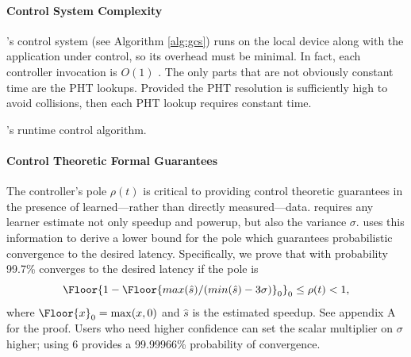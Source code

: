 \paragraph{Control System Complexity}
\SYSTEM{}'s control system (see Algorithm \ref{alg:gcs}) runs on the
local device along with the application under control, so its overhead
must be minimal.  In fact, each controller invocation is $O(1)$ .  The
only parts that are not obviously constant time are the PHT lookups.
Provided the PHT resolution is sufficiently high to avoid collisions,
then each PHT lookup requires constant time.
\begin{algorithm}[t]
\caption{\SYSTEM{}'s runtime control algorithm.}
\label{alg:gcs}
\end{algorithm}

\paragraph{Control Theoretic Formal Guarantees}
The controller's pole $\rho(t)$ is critical to providing control
theoretic guarantees in the presence of learned---rather than directly
measured---data.  \SYSTEM{} requires any learner estimate not only
speedup and powerup, but also the variance $\sigma$.  \SYSTEM{} uses
this information to derive a lower bound for the pole which guarantees
probabilistic convergence to the desired latency. Specifically, we
prove that with probability 99.7\% \SYSTEM{} converges to the desired
latency if the pole is
$$\Floor{1- \Floor{max(\hat{s})/(min(\hat{s}) - 3\sigma)}_0}_0 \leq \rho(t)
< 1,$$ where $\Floor{x}_0 = \max(x,0)$ and $\hat{s}$ is the estimated
speedup. See appendix A for the proof. Users who need higher
confidence can set the scalar multiplier on $\sigma$ higher; \eg{}
using $6$ provides a 99.99966\% probability of convergence.

